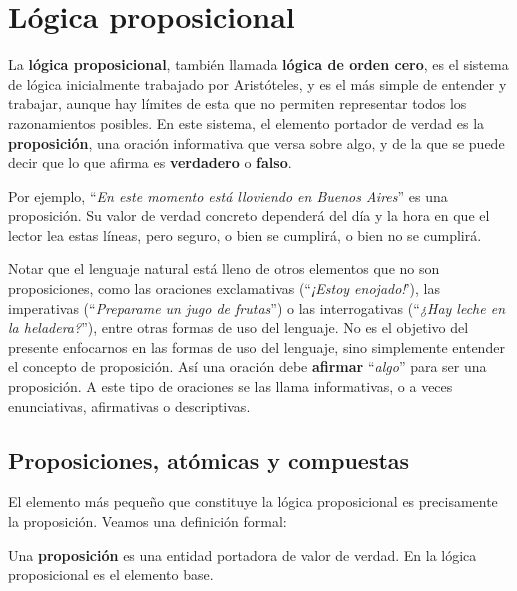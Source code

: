
\chapter{Lógica proposicional}
\label{chap:logica_proposicional}

La \textbf{lógica proposicional}, también llamada \textbf{lógica de orden cero},
es el sistema de lógica inicialmente trabajado por Aristóteles, y es el más
simple de entender y trabajar, aunque hay límites de esta que no permiten
representar todos los razonamientos posibles. En este sistema, el elemento
portador de verdad es la \textbf{proposición}, una oración informativa que versa
sobre algo, y de la que se puede decir que lo que afirma es \textbf{verdadero} o
\textbf{falso}.

Por ejemplo, ``\textit{En este momento está lloviendo en Buenos Aires}'' es una
proposición. Su valor de verdad concreto dependerá del día y la hora en que el
lector lea estas líneas, pero seguro, o bien se cumplirá, o bien no se cumplirá.

Notar que el lenguaje natural está lleno de otros elementos que no son
proposiciones, como las oraciones exclamativas (``\textit{¡Estoy enojado!}'),
las imperativas (``\textit{Preparame un jugo de frutas}'') o las interrogativas
(``\textit{¿Hay leche en la heladera?}''), entre otras formas de uso del
lenguaje. No es el objetivo del presente enfocarnos en las formas de uso del
lenguaje, sino simplemente entender el concepto de proposición. Así una oración
debe \textbf{afirmar} ``\textit{algo}'' para ser una proposición. A este tipo de
oraciones se las llama informativas, o a veces enunciativas, afirmativas o
descriptivas.

\section{Proposiciones, atómicas y compuestas}
\label{chap:logica_proposicional:sec:proposiciones}

El elemento más pequeño que constituye la lógica proposicional es precisamente
la proposición. Veamos una definición formal:

\begin{definition}
    Una \textbf{proposición} es una entidad
    portadora de valor de verdad. En la lógica proposicional es el elemento
    base.
\end{definition}

